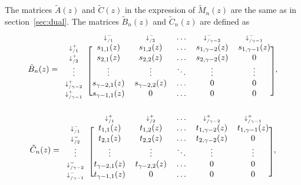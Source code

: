 \documentclass{article}
\begin{document}
The matrices $\tilde{A}(z)$ and $\tilde{C}(z)$ in the expression of
$\tilde{M}_n(z)$ are the same as in section~\ref{sec:dual}. The matrices
$\tilde{B}_n(z)$ and $\tilde{C}_n(z)$ are defined as
\begin{equation*}
\tilde{B}_n(z) = 
\begin{blockarray}{cccccc}
   & \scriptstyle{\downarrow_{/1}^-} & \scriptstyle{\downarrow_{/2}^-} &
   \ldots & \scriptstyle{\downarrow_{/\gamma-2}^-} &
   \scriptstyle{\downarrow_{/\gamma-1}^-} \\
\begin{block}{c[ccccc]}
\scriptstyle{\downarrow_{/1}^+} & s_{1,1}(z) & s_{1,2}(z) &
    \ldots & s_{1,\gamma-2}(z) & s_{1,\gamma-1}(z) \\
\scriptstyle{\downarrow_{/2}^+} & s_{2,1}(z) & s_{2,2}(z) &
    \ldots & s_{2,\gamma-2}(z) & 0 \\
\vdots & \vdots & \vdots & \ddots & \vdots & \vdots \\
\scriptstyle{\downarrow_{/\gamma-2}^+} & s_{\gamma-2,1}(z) &
    s_{\gamma-2,2}(z) & \ldots & 0 & 0 \\
\scriptstyle{\downarrow_{/\gamma-1}^+} & s_{\gamma-1,1}(z) & 0 &
    \ldots & 0 & 0 \\
\end{block}
\end{blockarray},
\end{equation*}
\begin{equation*}
\tilde{C}_n(z) = 
\begin{blockarray}{cccccc}
   & \scriptstyle{\downarrow_{/1}^+} & \scriptstyle{\downarrow_{/2}^+} &
    \ldots & \scriptstyle{\downarrow_{/\gamma-2}^+} &
    \scriptstyle{\downarrow_{/\gamma-1}^+} \\
\begin{block}{c[ccccc]}
\scriptstyle{\downarrow_{/1}^-} & t_{1,1}(z) & t_{1,2}(z) &
    \ldots & t_{1,\gamma-2}(z) & t_{1,\gamma-1}(z) \\
\scriptstyle{\downarrow_{/2}^-} & t_{2,1}(z) & t_{2,2}(z) &
    \ldots & t_{2,\gamma-2}(z) & 0 \\
\vdots & \vdots & \vdots & \ddots & \vdots & \vdots \\
\scriptstyle{\downarrow_{/\gamma-2}^-} & t_{\gamma-2,1}(z) &
    t_{\gamma-2,2}(z) & \ldots & 0 & 0 \\
\scriptstyle{\downarrow_{/\gamma-1}^-} & t_{\gamma-1,1}(z) &
    0 & \ldots & 0 & 0 \\
\end{block}
\end{blockarray},
\end{equation*}
\end{document}
